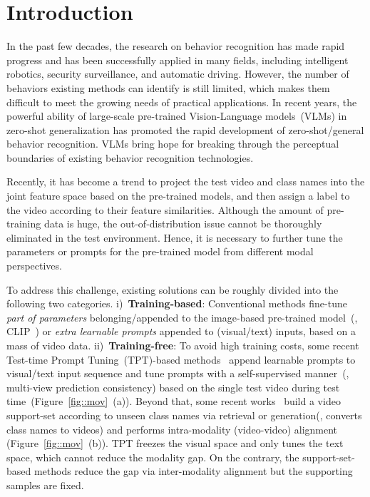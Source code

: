 \section{Introduction}
\label{intro}
{
In the past few decades, the research on behavior recognition has made rapid progress and has been successfully applied in many fields, including intelligent robotics, security surveillance, and automatic driving. However, the number of behaviors existing methods can identify is still limited, which makes them difficult to meet the growing needs of practical applications. In recent years, the powerful ability of large-scale pre-trained Vision-Language models~(VLMs) in zero-shot generalization has promoted the rapid development of zero-shot/general behavior recognition. VLMs bring hope for breaking through the perceptual boundaries of existing behavior recognition technologies. 

Recently, it has become a trend to project the test video and class names into the joint feature space based on the pre-trained models, and then assign a label to the video according to their feature similarities. Although the amount of pre-training data is huge, the out-of-distribution issue cannot be thoroughly eliminated in the test environment. Hence, it is necessary to further tune the parameters or prompts for the pre-trained model from different modal perspectives.

To address this challenge, existing solutions can be roughly divided into the following two categories. i)~\textbf{Training-based}: Conventional methods fine-tune \textit{part of parameters} belonging/appended to the image-based pre-trained model~(\eg, CLIP~\cite{radford2021learning}) or \textit{extra learnable prompts} appended to (visual/text) inputs, based on a mass of video data. ii)~\textbf{Training-free}: To avoid high training costs, some recent Test-time Prompt Tuning~(TPT)-based methods~\cite{shu2022tpt,yan_2024_DTSTPT} append learnable prompts to visual/text input sequence and tune prompts with a self-supervised manner~(\eg, multi-view prediction consistency) based on the single test video during test time~(Figure~\ref{fig::mov}~(a)). Beyond that, some recent works~\cite{udandarao2022sus-x,zhang2021tipadaptertrainingfreeclipadapterbetter} build a video support-set according to unseen class names via retrieval or generation(\ie, converts class names to videos) and performs intra-modality (video-video) alignment (Figure~\ref{fig::mov}~(b)). TPT freezes the visual space and only tunes the text space, which cannot reduce the modality gap. On the contrary, the support-set-based methods reduce the gap via inter-modality alignment but the supporting samples are fixed.

}

